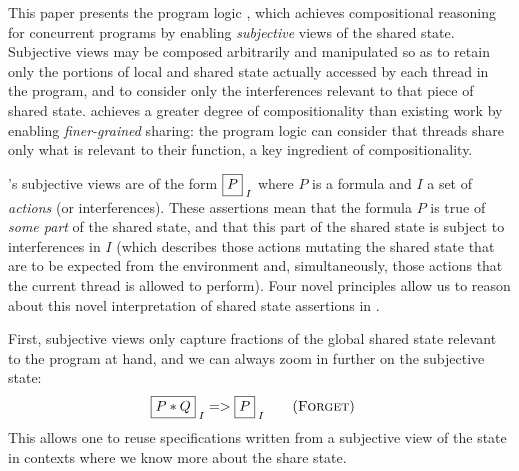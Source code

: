 
This paper presents the program logic \colosl, which achieves
compositional reasoning for concurrent programs by enabling
\emph{subjective} views of the shared state. Subjective views may be
composed arbitrarily and manipulated so as to retain only the portions
of local and shared state actually accessed by each thread in the
program, and to consider only the interferences relevant to that piece
of shared state. \colosl achieves a greater degree of compositionality
than existing work by enabling \emph{finer-grained} sharing: the
program logic can consider that threads share only what is relevant to
their function, a key ingredient of compositionality.


\colosl's subjective views are of the form $\shared P I$ where $P$ is
a formula and $I$ a set of \emph{actions} (or interferences). These
assertions mean that the formula $P$ is true of \emph{some part} of
the shared state, and that this part of the shared state is subject to
interferences in $I$ (which describes those actions mutating the
shared state that are to be expected from the environment and,
simultaneously, those actions that the current thread is allowed to
perform).  Four novel principles allow us to reason about this novel
interpretation of shared state assertions in \colosl.

First, subjective views only capture fractions of the global shared
state relevant to the program at hand, and we can always zoom in
further on the subjective state:
\begin{align*}
  \shared{P * Q}{I} &=> \shared{P}{I}  \tag{\textsc{Forget}}
\end{align*}
This allows one to reuse specifications written from a subjective view
of the state in contexts where we know more about the share state.

